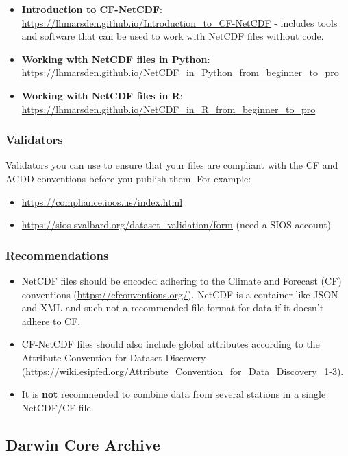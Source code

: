 \documentclass[a4paper,12pt]{article}
\begin{document}
\begin{itemize}
    \item \textbf{Introduction to CF-NetCDF}: \url{https://lhmarsden.github.io/Introduction_to_CF-NetCDF} - includes tools and software that can be used to work with NetCDF files without code.
    \item \textbf{Working with NetCDF files in Python}: \url{https://lhmarsden.github.io/NetCDF_in_Python_from_beginner_to_pro} \citep{marsden_netcdf_python}
    \item \textbf{Working with NetCDF files in R}: \url{https://lhmarsden.github.io/NetCDF_in_R_from_beginner_to_pro} \citep{marsden_netcdf_r}
\end{itemize}

\subsubsection{Validators}

Validators you can use to ensure that your files are compliant with the CF and ACDD conventions before you publish them. For example:
\begin{itemize}
    \item \url{https://compliance.ioos.us/index.html}
    \item \url{https://sios-svalbard.org/dataset_validation/form} (need a SIOS account)
\end{itemize}

\subsubsection{Recommendations}
\begin{itemize}
\item NetCDF files should be encoded adhering to the Climate and Forecast (CF) conventions (\url{https://cfconventions.org/}). NetCDF is a container like JSON and XML and such not a recommended file format for data if it doesn't adhere to CF.
\item CF-NetCDF files should also include global attributes according to the
Attribute Convention for Dataset Discovery (\url{https://wiki.esipfed.org/Attribute_Convention_for_Data_Discovery_1-3}).
\item It is \textbf{not} recommended to combine data from several stations in
a single NetCDF/CF file.
\end{itemize}

\subsection{Darwin Core Archive}
\end{document}
